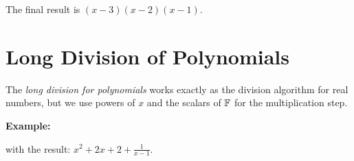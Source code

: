 The final result is \((x - 3)(x - 2)(x - 1)\).

\section{Long Division of Polynomials}

The \emph{long division for polynomials} works exactly as the division algorithm for real numbers, but we use powers of \(x\) and the scalars of \(\mathbb{F}\) for the 
multiplication step.

\textbf{Example:}


with the result: \(x^2 + 2x + 2 + \frac{1}{x-1}\).
